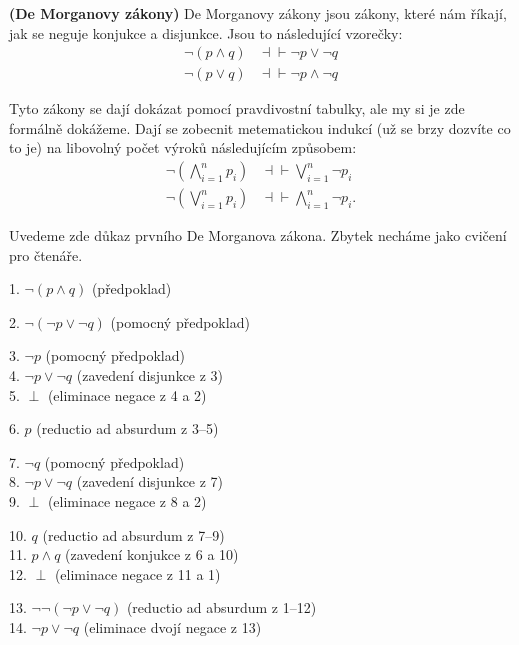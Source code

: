 \begin{example} \textbf{(De Morganovy zákony)}
  De Morganovy zákony jsou zákony, které nám říkají, jak se neguje konjukce a disjunkce. Jsou to následující vzorečky:
  \begin{equation}
    \begin{aligned}
      \neg (p \land q) &\dashv\vdash \neg p \lor \neg q \\
      \neg (p \lor q) &\dashv\vdash \neg p \land \neg q
    \end{aligned}
  \end{equation}

  Tyto zákony se dají dokázat pomocí pravdivostní tabulky, ale my si je zde formálně dokážeme. Dají se zobecnit metematickou indukcí (už se brzy dozvíte co to je) na libovolný počet výroků následujícím způsobem:
  \begin{equation}
    \begin{aligned}
      \neg \left(\bigwedge_{i=1}^{n} p_i\right) &\dashv\vdash \bigvee_{i=1}^{n} \neg p_i \\
      \neg \left(\bigvee_{i=1}^{n} p_i\right) &\dashv\vdash \bigwedge_{i=1}^{n} \neg p_i.
    \end{aligned}
  \end{equation}

  Uvedeme zde důkaz prvního De Morganova zákona. Zbytek necháme jako cvičení pro čtenáře.

  \begin{proofbox}

    1. $\neg (p \land q)$ (předpoklad)
    \begin{proofbox}
      2. $\neg(\neg p \lor \neg q)$ (pomocný předpoklad)
      \begin{proofbox}
        3. $\neg p$ (pomocný předpoklad) \\
        4. $\neg p \lor \neg q$ (zavedení disjunkce z 3) \\
        5. $\perp$ (eliminace negace z 4 a 2)
      \end{proofbox}
      6. $p$ (reductio ad absurdum z 3--5) 
      \begin{proofbox}
        7. $\neg q$ (pomocný předpoklad) \\
        8. $\neg p \lor \neg q$ (zavedení disjunkce z 7) \\
        9. $\perp$ (eliminace negace z 8 a 2)
      \end{proofbox}
      10. $q$ (reductio ad absurdum z 7--9) \\
      11. $p \land q$ (zavedení konjukce z 6 a 10) \\
      12. $\perp$ (eliminace negace z 11 a 1)
    \end{proofbox}
    13. $\neg\neg(\neg p \lor \neg q)$ (reductio ad absurdum z 1--12) \\
    14. $\neg p \lor \neg q$ (eliminace dvojí negace z 13)
  \end{proofbox}


\end{example}

